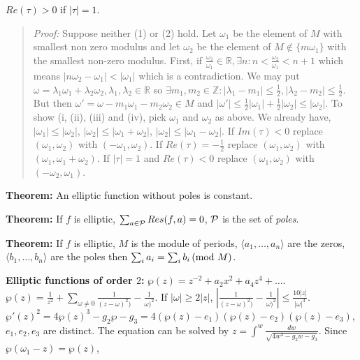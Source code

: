 $Re(\tau)>0$ if $|\tau|=1$.
\begin{quote}
\emph{Proof:}
Suppose neither (1) or (2) hold.  Let $\omega_1$ be the element of $M$ with smallest non zero modulus and
let $\omega_2$ be the element of $M \notin \{ m \omega_1 \}$ with the smallest non-zero modulus.  First,
if ${\frac {\omega_2} {\omega_1}} \in {\mathbb R}, \exists n:  n < {\frac {\omega_2}{\omega_1}} < n+1$ which
means $|n \omega_2 - \omega_1| < | \omega_1|$ which is a contradiction.  We may put
$\omega= \lambda_1 \omega_1 + \lambda_2 \omega_2, \lambda_1, \lambda_2 \in {\mathbb R} $ 
so $\exists m_1, m_2 \in {\mathbb Z}: | \lambda_1 - m_1 | \leq {\frac 1 2}, | \lambda_2 - m_2 | \leq {\frac 1 2}$.
But then $\omega'= \omega - m_1 \omega_1 - m_2 \omega_2 \in M$ and
$ |\omega'| \leq {\frac 1 2} |\omega_1|+ {\frac 1 2} |\omega_2| \leq |\omega_2| $.  To show (i, (ii), (iii) and
(iv), pick 
$\omega_1$ and
$\omega_2$ as above.  We already have, 
$ |\omega_1| \leq |\omega_2| $,
$ |\omega_2| \leq |\omega_1+\omega_2| $,
$ |\omega_2| \leq |\omega_1-\omega_2| $.  
If $Im(\tau) <0$ replace $(\omega_1 , \omega_2)$ with $(-\omega_1 , \omega_2)$.
If $Re(\tau) = - {\frac 1 2}$ replace $(\omega_1 , \omega_2)$ with $(\omega_1 , \omega_1+\omega_2)$.
If $|\tau|=1$ and $Re(\tau) < 0$ replace $(\omega_1 , \omega_2)$ with $(-\omega_2 , \omega_1)$.
\end{quote}
{\bf Theorem:}  An elliptic function without poles is constant.
\begin{quote}
\end{quote}
{\bf Theorem:}  If $f$ is elliptic, $\sum_{a \in {\cal P}} Res(f,a) = 0$, ${\cal P}$ is the set of \emph{poles}.
\begin{quote}
\end{quote}
{\bf Theorem:}  If $f$ is elliptic,  $M$ is the module of periods,
$\langle a_1 , \ldots, a_n \rangle$ are the zeros,
$\langle b_1 , \ldots, b_n \rangle$ are the poles then
$\sum_i a_i= \sum_i b_i \thinspace \textnormal{(mod } M \textnormal{)}$.
\begin{quote}
\end{quote}
{\bf Elliptic functions of order $2$:} $\wp(z)= z^{-2}+ a_2x^2+a_4 z^4 + \ldots $.
$\wp(z)= {\frac 1 {z^2}} + \sum_{\omega \ne 0} {\frac 1 {(z- \omega)^2)}}- {\frac 1 {\omega)^2}}$.  If
$|\omega| \geq 2|z|$, 
$|{\frac 1 {(z- \omega)^2)}}- {\frac 1 {\omega)^2}}| \leq {\frac {10 |z|} {|\omega|^3}}$.
$\wp'(z)^2= 4 \wp(z)^3 - g_2 \wp - g_3= 4 (\wp(z)-e_1) (\wp(z)-e_2) (\wp(z)-e_3) $,
$e_1, e_2, e_3$ are distinct.  The equation can be solved by $z= \int^w {\frac {dw}
{\sqrt{4w^3 -  g_2 w - g_3}}}$.  Since $\wp(\omega_1 -z)= \wp(z)$, 
